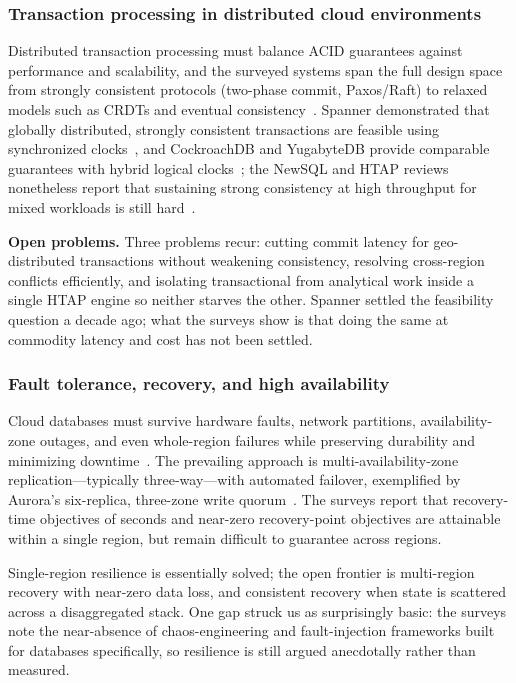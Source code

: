 \documentclass[a4paper,fleqn]{cas-sc}
\begin{document}
\subsubsection{Transaction processing in distributed cloud environments}
\label{subsubsec:transactions}

Distributed transaction processing must balance ACID guarantees against performance and scalability, and the surveyed systems span the full design space from strongly consistent protocols (two-phase commit, Paxos/Raft) to relaxed models such as CRDTs and eventual consistency~\cite{Corbett2013Spanner,Taft2020Cockroach}. Spanner demonstrated that globally distributed, strongly consistent transactions are feasible using synchronized clocks~\cite{Corbett2013Spanner}, and CockroachDB and YugabyteDB provide comparable guarantees with hybrid logical clocks~\cite{Taft2020Cockroach}; the NewSQL and HTAP reviews nonetheless report that sustaining strong consistency at high throughput for mixed workloads is still hard~\cite{Haas2024HTAPSurvey}.

\textbf{Open problems.} Three problems recur: cutting commit latency for geo-distributed transactions without weakening consistency, resolving cross-region conflicts efficiently, and isolating transactional from analytical work inside a single HTAP engine so neither starves the other. Spanner settled the feasibility question a decade ago; what the surveys show is that doing the same at commodity latency and cost has not been settled.

\subsubsection{Fault tolerance, recovery, and high availability}
\label{subsubsec:faulttolerance}

Cloud databases must survive hardware faults, network partitions, availability-zone outages, and even whole-region failures while preserving durability and minimizing downtime~\cite{Verbitski2017,Li2024CloudNativeSurvey}. The prevailing approach is multi-availability-zone replication---typically three-way---with automated failover, exemplified by Aurora's six-replica, three-zone write quorum~\cite{Verbitski2017}. The surveys report that recovery-time objectives of seconds and near-zero recovery-point objectives are attainable within a single region, but remain difficult to guarantee across regions.

Single-region resilience is essentially solved; the open frontier is multi-region recovery with near-zero data loss, and consistent recovery when state is scattered across a disaggregated stack. One gap struck us as surprisingly basic: the surveys note the near-absence of chaos-engineering and fault-injection frameworks built for databases specifically, so resilience is still argued anecdotally rather than measured.
\end{document}
